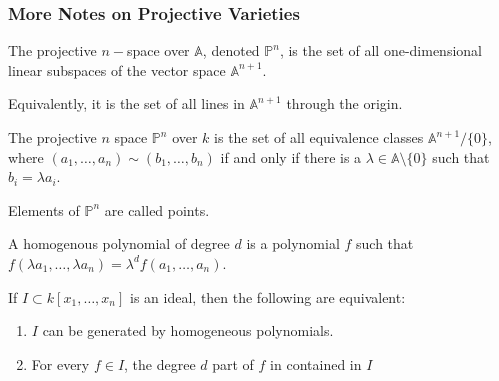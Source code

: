 \documentclass[crop=false,class=book,oneside]{standalone}
\begin{document}
            \subsubsection{More Notes on Projective Varieties}
                \begin{definition}
                    The projective $n-$space over $\mathbb{A}$,
                    denoted $\mathbb{P}^{n}$, is the set of all
                    one-dimensional linear subspaces of the vector
                    space $\mathbb{A}^{n+1}$.
                \end{definition}
                \begin{remark}
                    Equivalently, it is the set of all lines
                    in $\mathbb{A}^{n+1}$ through the origin.
                \end{remark}
                \begin{definition}
                    The projective $n$ space $\mathbb{P}^{n}$ over $k$
                    is the set of all equivalence classes
                    $\mathbb{A}^{n+1}/\{0\}$, where
                    $(a_{1},\hdots,a_{n})\sim(b_{1},\hdots,b_{n})$
                    if and only if there is a
                    $\lambda\in\mathbb{A}\setminus\{0\}$
                    such that $b_{i}=\lambda{a_{i}}$.
                \end{definition}
                \begin{remark}
                    Elements of $\mathbb{P}^{n}$ are called points.
                \end{remark}
                \begin{definition}
                    A homogenous polynomial of degree $d$
                    is a polynomial $f$ such that
                    $f(\lambda a_1,\hdots,\lambda a_n)%
                     =\lambda^d f(a_1,\hdots, a_n)$.
                \end{definition}
                \begin{theorem}
                    If $I\subset k[x_1,\hdots ,x_n]$ is an ideal,
                    then the following are equivalent:
                    \begin{enumerate}
                        \item $I$ can be generated by
                              homogeneous polynomials.
                        \item For every $f\in I$, the degree
                              $d$ part of $f$ in contained in $I$
                    \end{enumerate}
                \end{theorem}
\end{document}
